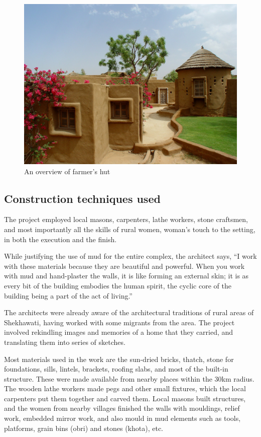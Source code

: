 \begin{figure}[H]
  \centering
  \includegraphics[angle=0,width=1.0\textwidth]{img/dc-fh}
  \caption{An overview of farmer's hut}
  \label{fig:dc-wh} 
\end{figure}


\subsection{Construction techniques used} %
\label{sub:dcm_ctu}

The project employed local masons, carpenters, lathe workers, stone craftsmen, and most importantly all the skills of rural women, woman's touch to the setting, in both the execution and the finish.

While justifying the use of mud for the entire complex, the architect says, ``I work with these materials because they are beautiful and powerful. When you work with mud and hand-plaster the walls, it is like forming an external skin; it is as every bit of the building embodies the human spirit, the cyclic core of the building being a part of the act of living.''

The architects were already aware of the architectural traditions of rural areas of Shekhawati, having worked with some migrants from the area. The project involved rekindling images and memories of a home that they carried, and translating them into series of sketches.

Most materials used in the work are the sun-dried bricks, thatch, stone for foundations, sills, lintels, brackets, roofing slabs, and most of the built-in structure. These were made available from nearby places within the 30km radius. The wooden lathe workers made pegs and other small fixtures, which the local carpenters put them together and carved them. Local masons built structures, and the women from nearby villages finished the walls with mouldings, relief work, embedded mirror work, and also mould in mud elements such as tools, platforms, grain bins (obri) and stones (khota), etc.

